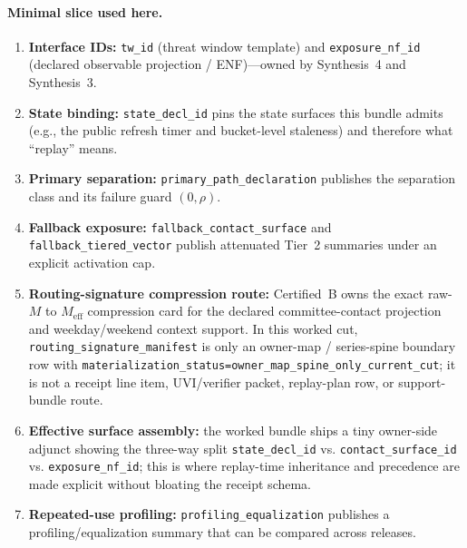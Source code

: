 \documentclass[11pt]{article}
\begin{document}
\paragraph{Minimal slice used here.}
\begin{enumerate}[leftmargin=*]
\item \textbf{Interface IDs:} \texttt{tw\_id} (threat window template) and \texttt{exposure\_nf\_id} (declared observable projection / ENF)---owned by Synthesis~4 and Synthesis~3.\cite{series:threatwindows,series:traceifaces}
\item \textbf{State binding:} \texttt{state\_decl\_id} pins the state surfaces this bundle admits (e.g., the public refresh timer and bucket-level staleness) and therefore what ``replay'' means.\cite{series:planstateequiv}
\item \textbf{Primary separation:} \texttt{primary\_path\_declaration} publishes the separation class and its failure guard $(0,\rho)$.\cite{series:primarysepmanifest,series:probsep}
\item \textbf{Fallback exposure:} \texttt{fallback\_contact\_surface} and \texttt{fallback\_tiered\_vector} publish attenuated Tier~2 summaries under an explicit activation cap.\cite{series:obsatten,series:fallbacktax,series:tieredobs}
\item \textbf{Routing-signature compression route:} Certified~B owns the exact raw-$M$ to $M_{\mathrm{eff}}$ compression card for the declared committee-contact projection and weekday/weekend context support. In this worked cut, \texttt{routing\_signature\_manifest} is only an owner-map / series-spine boundary row with \texttt{materialization\_status=owner\_map\_spine\_only\_current\_cut}; it is not a receipt line item, UVI/verifier packet, replay-plan row, or support-bundle route.\cite{series:certifiedB}
\item \textbf{Effective surface assembly:} the worked bundle ships a tiny owner-side adjunct showing the three-way split \texttt{state\_decl\_id} vs. \texttt{contact\_surface\_id} vs. \texttt{exposure\_nf\_id}; this is where replay-time inheritance and precedence are made explicit without bloating the receipt schema.\cite{series:receiptitems,series:deployedsurfaces}
\item \textbf{Repeated-use profiling:} \texttt{profiling\_equalization} publishes a profiling/equalization summary that can be compared across releases.\cite{series:profiling}
\end{enumerate}
\end{document}
